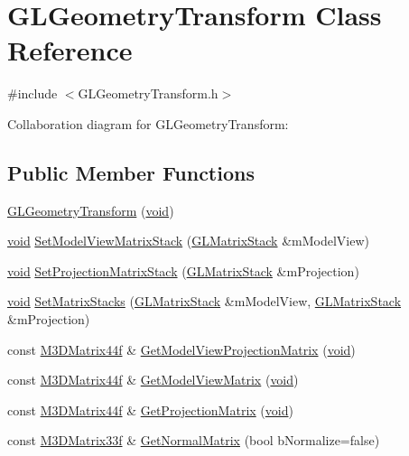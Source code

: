 \hypertarget{class_g_l_geometry_transform}{\section{G\-L\-Geometry\-Transform Class Reference}
\label{class_g_l_geometry_transform}
}


{\ttfamily \#include $<$G\-L\-Geometry\-Transform.\-h$>$}



Collaboration diagram for G\-L\-Geometry\-Transform\-:
\subsection*{Public Member Functions}
\begin{DoxyCompactItemize}
\item 
\hyperlink{class_g_l_geometry_transform_ac12c81c996e670194e0b405758848cc7}{G\-L\-Geometry\-Transform} (\hyperlink{_s_d_l__opengl_8h_a3db05964a3cc4410f35b7ea2b7eb850d}{void})
\item 
\hyperlink{_s_d_l__opengl_8h_a3db05964a3cc4410f35b7ea2b7eb850d}{void} \hyperlink{class_g_l_geometry_transform_a274a2fa32a96a450d572fca44992ab54}{Set\-Model\-View\-Matrix\-Stack} (\hyperlink{class_g_l_matrix_stack}{G\-L\-Matrix\-Stack} \&m\-Model\-View)
\item 
\hyperlink{_s_d_l__opengl_8h_a3db05964a3cc4410f35b7ea2b7eb850d}{void} \hyperlink{class_g_l_geometry_transform_a46a56ad2f8f0b125471b953232dccf4b}{Set\-Projection\-Matrix\-Stack} (\hyperlink{class_g_l_matrix_stack}{G\-L\-Matrix\-Stack} \&m\-Projection)
\item 
\hyperlink{_s_d_l__opengl_8h_a3db05964a3cc4410f35b7ea2b7eb850d}{void} \hyperlink{class_g_l_geometry_transform_a0d4786d4988445ee7364df85c0354192}{Set\-Matrix\-Stacks} (\hyperlink{class_g_l_matrix_stack}{G\-L\-Matrix\-Stack} \&m\-Model\-View, \hyperlink{class_g_l_matrix_stack}{G\-L\-Matrix\-Stack} \&m\-Projection)
\item 
const \hyperlink{math3d_8h_a1e8690467d81d5ed97c5ecc3a144a4ac}{M3\-D\-Matrix44f} \& \hyperlink{class_g_l_geometry_transform_a57b6a1d7f784234921b783893a1d584d}{Get\-Model\-View\-Projection\-Matrix} (\hyperlink{_s_d_l__opengl_8h_a3db05964a3cc4410f35b7ea2b7eb850d}{void})
\item 
const \hyperlink{math3d_8h_a1e8690467d81d5ed97c5ecc3a144a4ac}{M3\-D\-Matrix44f} \& \hyperlink{class_g_l_geometry_transform_a5a7741b13f76bc3b572f769ab5ec7ecd}{Get\-Model\-View\-Matrix} (\hyperlink{_s_d_l__opengl_8h_a3db05964a3cc4410f35b7ea2b7eb850d}{void})
\item 
const \hyperlink{math3d_8h_a1e8690467d81d5ed97c5ecc3a144a4ac}{M3\-D\-Matrix44f} \& \hyperlink{class_g_l_geometry_transform_a8fb2620effe367c08066cc2f52f95db6}{Get\-Projection\-Matrix} (\hyperlink{_s_d_l__opengl_8h_a3db05964a3cc4410f35b7ea2b7eb850d}{void})
\item 
const \hyperlink{math3d_8h_a8a8053baac8d5fc03f1dd4316d8da1dd}{M3\-D\-Matrix33f} \& \hyperlink{class_g_l_geometry_transform_a8665b1cec49a4913f51e9d59578a12c9}{Get\-Normal\-Matrix} (bool b\-Normalize=false)
\end{DoxyCompactItemize}
